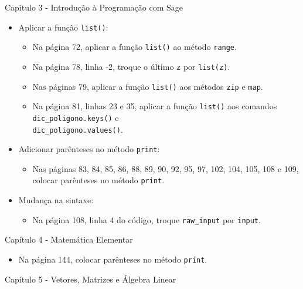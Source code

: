 \documentclass[10pt,a4paper]{report}
\begin{document}
\vspace{0.5cm}
\noindent
{ \large Capítulo 3 - Introdução à Programação com Sage}
\begin{itemize}
 \item Aplicar a função \verb|list()|:
 \begin{itemize}
 \item Na página 72, aplicar a função \verb|list()| ao método \verb|range|. 
 
 
 \item Na página 78, linha -2, troque o último \verb|z| por \verb|list(z)|.
 
 \item Nas páginas 79, aplicar a função \verb|list()| aos métodos \verb|zip| e \verb|map|.
 
 \item Na página 81, linhas 23 e 35, aplicar a função \verb|list()| aos comandos \verb|dic_poligono.keys()| e\\ \verb|dic_poligono.values()|.
 \end{itemize}


 
 \item Adicionar parênteses no método \verb|print|:
 \begin{itemize}
  
\item Nas páginas 83, 84, 85, 86, 88, 89, 90, 92, 95, 97, 102, 104, 105, 108 e 109, colocar parênteses no método \verb|print|.
 \end{itemize}
 
 
 
 \item Mudança na sintaxe:
\begin{itemize}
 \item Na página 108, linha 4 do código, troque \verb|raw_input| por \verb|input|.
\end{itemize}

\end{itemize}

\vspace{1cm}

\noindent
{\large Capítulo 4 - Matemática Elementar}

\begin{itemize}
 \item Na página 144,  colocar parênteses no método \verb|print|.
\end{itemize}



\vspace{0.5cm}
\noindent
{\large Capítulo 5 - Vetores, Matrizes e Álgebra Linear}
\end{document}
